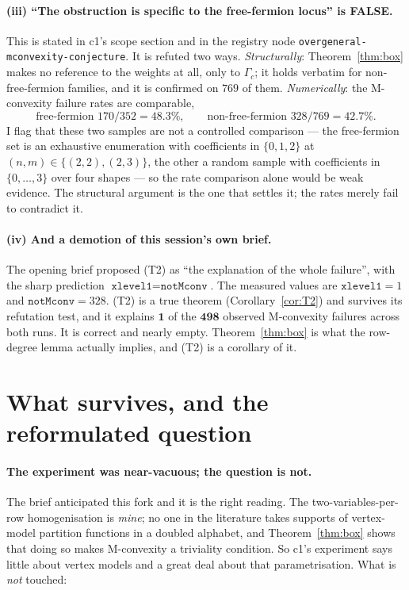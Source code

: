 \documentclass[11pt]{article}
\theoremstyle{definition}
\begin{document}
\paragraph{(iii) ``The obstruction is specific to the free-fermion locus'' is FALSE.}
This is stated in c1's scope section and in the registry node
\texttt{overgeneral-mconvexity-conjecture}. It is refuted two ways.
\emph{Structurally}: Theorem~\ref{thm:box} makes no reference to the weights at all, only to
$\Gamma_c$; it holds verbatim for non-free-fermion families, and it is confirmed on
$769$ of them. \emph{Numerically}: the M-convexity failure rates are comparable,
\[
\text{free-fermion }170/352=48.3\%,\qquad \text{non-free-fermion }328/769=42.7\% .
\]
I flag that these two samples are not a controlled comparison --- the free-fermion set is an
exhaustive enumeration with coefficients in $\{0,1,2\}$ at $(n,m)\in\{(2,2),(2,3)\}$, the
other a random sample with coefficients in $\{0,\dots,3\}$ over four shapes --- so the rate
comparison alone would be weak evidence. The structural argument is the one that settles it;
the rates merely fail to contradict it.

\paragraph{(iv) And a demotion of this session's own brief.}
The opening brief proposed (T2) as ``the explanation of the whole failure'', with the sharp
prediction $\texttt{xlevel1}=\texttt{notMconv}$. The measured values are
$\texttt{xlevel1}=1$ and $\texttt{notMconv}=328$. (T2) is a true theorem
(Corollary~\ref{cor:T2}) and survives its refutation test, and it explains
$\mathbf{1}$ of the $\mathbf{498}$ observed M-convexity failures across both runs. It is
correct and nearly empty. Theorem~\ref{thm:box} is what the row-degree lemma actually
implies, and (T2) is a corollary of it.

\section{What survives, and the reformulated question}

\paragraph{The experiment was near-vacuous; the question is not.}
The brief anticipated this fork and it is the right reading. The two-variables-per-row
homogenisation is \emph{mine}; no one in the literature takes supports of vertex-model
partition functions in a doubled alphabet, and Theorem~\ref{thm:box} shows that doing so
makes M-convexity a triviality condition. So c1's experiment says little about vertex models
and a great deal about that parametrisation. What is \emph{not} touched:
\end{document}
